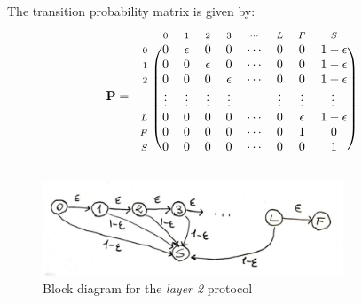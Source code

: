 \documentclass[../template.tex]{subfiles}
\begin{document}
The transition probability matrix is given by:
\begin{align*}
    \textbf{P} =  \begin{blockarray}{l*{9}{c}}
        \begin{block}{l*{9}{>{\scriptstyle}c<{}}}
            & 0 & 1 & 2 & 3 & \cdots & L & F & S\\
        \end{block}
        \begin{block}{>{\scriptstyle}r<{}(*{9}{c})}
            0 & 0 & \epsilon & 0 & 0 & \cdots & 0 & 0 & 1-\epsilon\\
            1 & 0 & 0 & \epsilon & 0 & \cdots & 0 & 0 & 1-\epsilon\\
            2 & 0 & 0 & 0 & \epsilon & \cdots & 0 & 0 & 1-\epsilon\\
            \vdots & \vdots & \vdots & \vdots & \vdots & & \vdots & \vdots & \vdots\\
            L & 0 & 0 & 0 & 0 & \cdots & 0 & \epsilon & 1-\epsilon\\
            F & 0 & 0 & 0 & 0 & \cdots & 0 & 1 & 0\\
            S & 0 & 0 & 0 & 0 & \cdots & 0 & 0 & 1\\
        \end{block}
    \end{blockarray}
\end{align*}

\begin{figure}[htp]
    \centering
    \includegraphics[width=0.8\textwidth]{image007.png}
    \caption{Block diagram for the \textit{layer 2} protocol  \label{fig:layer-two}}
\end{figure}
\end{document}
